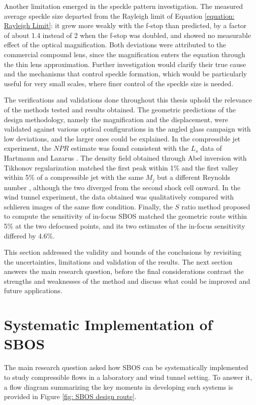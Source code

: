 Another limitation emerged in the speckle pattern investigation. The measured average speckle size departed from the Rayleigh limit of Equation \ref{equation: Rayleigh Limit}: it grew more weakly with the f-stop than predicted, by a factor of about 1.4 instead of 2 when the f-stop was doubled, and showed no measurable effect of the optical magnification. Both deviations were attributed to the commercial compound lens, since the magnification enters the equation through the thin lens approximation. Further investigation would clarify their true cause and the mechanisms that control speckle formation, which would be particularly useful for very small scales, where finer control of the speckle size is needed.

The verifications and validations done throughout this thesis uphold the relevance of the methods tested and results obtained. The geometric predictions of the design methodology, namely the magnification and the displacement, were validated against various optical configurations in the angled glass campaign with low deviations, and the larger ones could be explained. In the compressible jet experiment, the $NPR$ estimate was found consistent with the $L_s$ data of Hartmann and Lazarus \cite{Hartmann1941}. The density field obtained through Abel inversion with Tikhonov regularization matched the first peak within 1\% and the first valley within 5\% of a compressible jet with the same $M_j$ but a different Reynolds number \cite{Panda1999}, although the two diverged from the second shock cell onward. In the wind tunnel experiment, the data obtained was qualitatively compared with schlieren images of the same flow condition. Finally, the $S$ ratio method proposed to compute the sensitivity of in-focus SBOS matched the geometric route within 5\% at the two defocused points, and its two estimates of the in-focus sensitivity differed by 4.6\%.

This section addressed the validity and bounds of the conclusions by revisiting the uncertainties, limitations and validation of the results. The next section answers the main research question, before the final considerations contrast the strengths and weaknesses of the method and discuss what could be improved and future applications.

\section{Systematic Implementation of SBOS}
\label{section: systematic implementation}
The main research question asked how SBOS can be systematically implemented to study compressible flows in a laboratory and wind tunnel setting.  To answer it, a flow diagram summarizing the key moments in developing such systems is provided in Figure \ref{fig: SBOS design route}.

